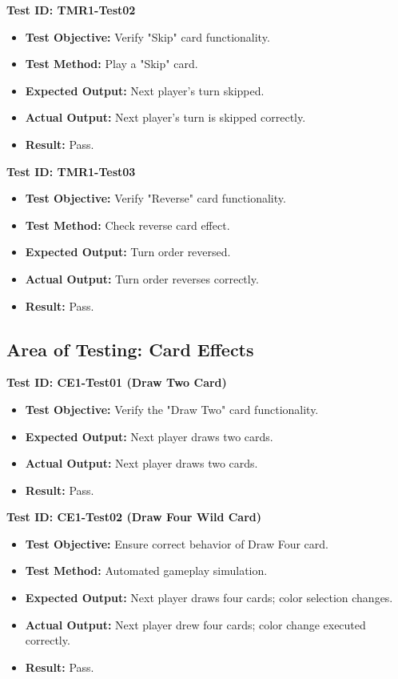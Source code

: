 \documentclass[12pt, titlepage]{article}
\begin{document}
\textbf{Test ID: TMR1-Test02}
\begin{itemize}
    \item \textbf{Test Objective:} Verify "Skip" card functionality.
    \item \textbf{Test Method:} Play a "Skip" card.
    \item \textbf{Expected Output:} Next player's turn skipped.
    \item \textbf{Actual Output:} Next player's turn is skipped correctly.
    \item \textbf{Result:} Pass.
\end{itemize}

\textbf{Test ID: TMR1-Test03}
\begin{itemize}
    \item \textbf{Test Objective:} Verify "Reverse" card functionality.
    \item \textbf{Test Method:} Check reverse card effect.
    \item \textbf{Expected Output:} Turn order reversed.
    \item \textbf{Actual Output:} Turn order reverses correctly.
    \item \textbf{Result:} Pass.
\end{itemize}

\subsection{Area of Testing: Card Effects}

\textbf{Test ID: CE1-Test01 (Draw Two Card)}
\begin{itemize}
    \item \textbf{Test Objective:} Verify the "Draw Two" card functionality.
    \item \textbf{Expected Output:} Next player draws two cards.
    \item \textbf{Actual Output:} Next player draws two cards.
    \item \textbf{Result:} Pass.
\end{itemize}

\textbf{Test ID: CE1-Test02 (Draw Four Wild Card)}
\begin{itemize}
    \item \textbf{Test Objective:} Ensure correct behavior of Draw Four card.
    \item \textbf{Test Method:} Automated gameplay simulation.
    \item \textbf{Expected Output:} Next player draws four cards; color selection changes.
    \item \textbf{Actual Output:} Next player drew four cards; color change executed correctly.
    \item \textbf{Result:} Pass.
\end{itemize}
\end{document}
